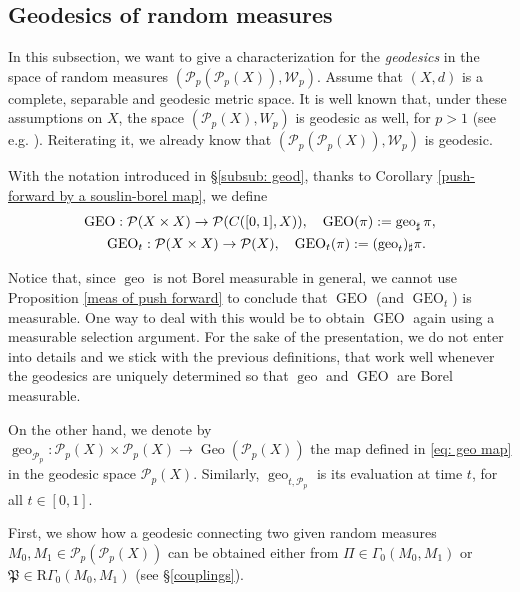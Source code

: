 \documentclass[10pt,leqno]{amsart}
\numberwithin{equation}{section}
\newcommand{\PP}{\mathcal{P}}
\begin{document}
\subsection{Geodesics of random measures}\label{subsec: geodesics}
In this subsection, we want to give a characterization for the \textit{geodesics} in the space of random measures $(\PP_p(\PP_p(X)), \mathcal{W}_p)$. Assume that $(X,d)$ is a complete, separable and geodesic metric space. It is well known that, under these assumptions on $X$, the space $(\PP_p(X),W_p)$ is geodesic as well, for $p>1$ (see e.g. \cite[Theorem 10.6]{ambrosio2021lectures}). Reiterating it, we already know that $(\PP_p(\PP_p(X)),\mathcal{W}_p)$ is geodesic. 

With the notation introduced in §\ref{subsub: geod}, thanks to Corollary \ref{push-forward by a souslin-borel map}, we define
\begin{equation}
\begin{aligned}
    \hfill\operatorname{GEO}: \PP(&X\times X) \to \PP(C([0,1],X)), \quad \operatorname{GEO}(\pi):= \operatorname{geo}_\sharp \pi, \hfill
    \\
    \hfill \operatorname{GEO}_t & : \PP(X\times X) \to \PP(X), \quad \operatorname{GEO}_t(\pi):= (\operatorname{geo}_t)_\sharp \pi. \hfill
\end{aligned}
\end{equation}

Notice that, since $\operatorname{geo}$ is not Borel measurable in general, we cannot use Proposition \ref{meas of push forward} to conclude that $\operatorname{GEO}$ (and $\operatorname{GEO}_t$) is measurable. One way to deal with this would be to obtain $\operatorname{GEO}$ again using a measurable selection argument. For the sake of the presentation, we do not enter into details and we stick with the previous definitions, that work well whenever the geodesics are uniquely determined so that $\operatorname{geo}$ and $\operatorname{GEO}$ are Borel measurable.

On the other hand, we denote by $\operatorname{geo}_{\PP_p}:\PP_p(X)\times \PP_p(X) \to \operatorname{Geo}(\PP_p(X))$ the map defined in \eqref{eq: geo map} in the geodesic space $\PP_p(X)$. Similarly, $\operatorname{geo}_{t,\PP_p}$ is its evaluation at time $t$, for all $t\in[0,1]$.


First, we show how a geodesic connecting two given random measures $M_0,M_1\in \PP_p(\PP_p(X))$ can be obtained either from $\Pi\in \Gamma_0(M_0,M_1)$ or $\mathfrak{P}\in \mathrm{R}\Gamma_0(M_0,M_1)$ (see §\ref{couplings}).
\end{document}
